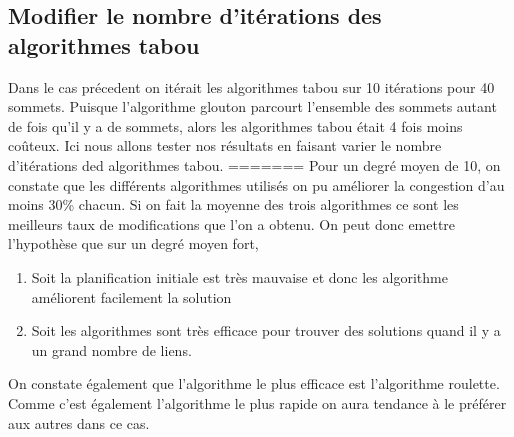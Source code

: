 \documentclass[a4paper,11pt]{article}
\begin{document}
	\subsection{Modifier le nombre d'itérations des algorithmes tabou}
		Dans le cas précedent on itérait les algorithmes tabou sur 10 itérations pour 40 sommets. Puisque l'algorithme glouton parcourt l'ensemble des sommets autant de fois qu'il y a de sommets, alors les algorithmes tabou était 4 fois moins coûteux. Ici nous allons tester nos résultats en faisant varier le nombre d'itérations ded algorithmes tabou.
=======
	Pour un degré moyen de 10, on constate que les différents algorithmes utilisés on pu améliorer la congestion d'au moins 30\% chacun. Si on fait la moyenne des trois algorithmes ce sont les meilleurs taux de modifications que l'on a obtenu. On peut donc emettre l'hypothèse que sur un degré moyen fort,
	\begin{enumerate}
		\item Soit la planification initiale est très mauvaise et donc les algorithme améliorent facilement la solution 
		\item Soit les algorithmes sont très efficace pour trouver des solutions quand il y a un grand nombre de liens. 
	\end{enumerate}
	On constate également que l'algorithme le plus efficace est l'algorithme roulette. Comme c'est également l'algorithme le plus rapide on aura tendance à le préférer aux autres dans ce cas.
	
\end{document}
